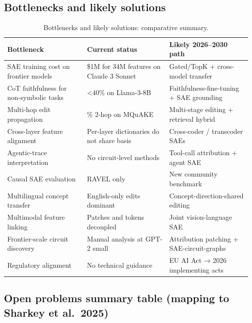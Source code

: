 \documentclass{article}
\begin{document}
\subsection{Bottlenecks and likely solutions}\label{bottlenecks-and-likely-solutions}

\begin{table}[t]
\centering
\caption{Bottlenecks and likely solutions: comparative summary.}
\label{tab:bottlenecks-and-likely-solutions}
\begin{tabular}{>{\raggedright\arraybackslash}p{0.3223\linewidth}
  >{\raggedright\arraybackslash}p{0.3388\linewidth}
  >{\raggedright\arraybackslash}p{0.3388\linewidth}}
\toprule
Bottleneck & Current status & Likely 2026--2030 path \\
\midrule
SAE training cost on frontier models & \$1M for 34M features on Claude 3 Sonnet & Gated/TopK + cross-model transfer \\
CoT faithfulness for non-symbolic tasks & \textless40\% on Llama-3-8B & Faithfulness-fine-tuning + SAE grounding \\
Multi-hop edit propagation & 21\% 2-hop on MQuAKE & Multi-stage editing + retrieval hybrid \\
Cross-layer feature alignment & Per-layer dictionaries do not share basis & Cross-coder / transcoder SAEs \\
Agentic-trace interpretation & No circuit-level methods & Tool-call attribution + agent SAE \\
Causal SAE evaluation & RAVEL only & New community benchmark \\
Multilingual concept transfer & English-only edits dominant & Concept-direction-shared editing \\
Multimodal feature linking & Patches and tokens decoupled & Joint vision-language SAE \\
Frontier-scale circuit discovery & Manual analysis at GPT-2 small & Attribution patching + SAE-circuit-graphs \\
Regulatory alignment & No technical guidance & EU AI Act → 2026 implementing acts \\
\end{tabular}
\end{table}

\subsection{Open problems summary table (mapping to Sharkey et al.~2025)}\label{open-problems-summary-table-mapping-to-sharkey-et-al.-2025}
\end{document}
